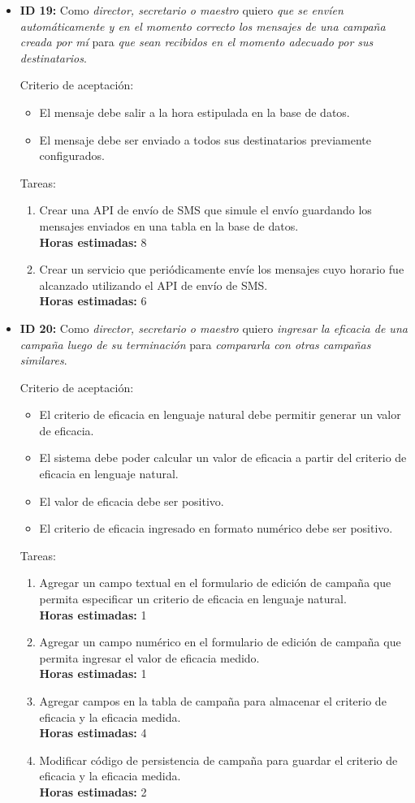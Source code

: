 \documentclass[a4paper, 10pt, twoside]{article}
\newenvironment{stories}{
  \begin{itemize}
}{
  \end{itemize}
}
\newcommand{\storyid}[4]{
  \item
  \textbf{ID #1:} Como \emph{#2} quiero \emph{#3} para \emph{#4}.
}
\newenvironment{tasks}{
  Tareas:
  \begin{enumerate}
}{
  \end{enumerate}
}
\newcommand{\task}[1] {
  \item #1.\\
  \textbf{Horas estimadas:}
}
\newenvironment{criterios}{
  Criterio de aceptación:
  \begin{itemize}
}{
  \end{itemize}
}
\newcommand{\criteria}[1] {
  \item #1
}
\begin{document}
\begin{stories}
  \begin{tasks}
    \task{Crear una interfaz que liste todas las campañas creadas por el usuario actual} 3
    \task{Crear interacción que muestre el formulario de edición de la campaña cuando se la selecciona en la lista anterior} 2
    \task{Modificar formulario de edición de campaña y sus componentes para que tenga precargados los datos de una campaña existente y permita modificarla} 0.5
    \task{Modificar código de persistencia de campañas para que permita guardar cambios en una campaña existente} 0.5
  \end{tasks}


  \storyid{19}{director, secretario o maestro}
             {que se envíen automáticamente y en el momento correcto los mensajes de una campaña creada por mí}
             {que sean recibidos en el momento adecuado por sus destinatarios}
  
   \begin{criterios}
  	\criteria{El mensaje debe salir a la hora estipulada en la base de datos.}
    \criteria{El mensaje debe ser enviado a todos sus destinatarios previamente configurados.}
  \end{criterios} 

  \begin{tasks}
    \task{Crear una API de envío de SMS que simule el envío guardando los mensajes enviados en una tabla en la base de datos} 8
    \task{Crear un servicio que periódicamente envíe los mensajes cuyo horario fue alcanzado utilizando el API de envío de SMS} 6
  \end{tasks}


  \storyid{20}{director, secretario o maestro}
             {ingresar la eficacia de una campaña luego de su terminación}
             {compararla con otras campañas similares}
        
   \begin{criterios}
  	\criteria{El criterio de eficacia en lenguaje natural debe permitir generar un valor de eficacia.}
    \criteria{El sistema debe poder calcular un valor de eficacia a partir del criterio de eficacia en lenguaje natural.}
    \criteria{El valor de eficacia debe ser positivo.}
    \criteria{El criterio de eficacia ingresado en formato numérico debe ser positivo.}
  \end{criterios} 

  \begin{tasks}
    \task{Agregar un campo textual en el formulario de edición de campaña que permita especificar un criterio de eficacia en lenguaje natural} 1
    \task{Agregar un campo numérico en el formulario de edición de campaña que permita ingresar el valor de eficacia medido} 1
    \task{Agregar campos en la tabla de campaña para almacenar el criterio de eficacia y la eficacia medida} 4
    \task{Modificar código de persistencia de campaña para guardar el criterio de eficacia y la eficacia medida} 2
  \end{tasks}
\end{stories}
\end{document}
